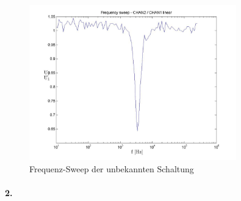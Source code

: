 \documentclass[a4paper]{article}
\begin{document}
\begin{figure}[H]
    \centering
    \includegraphics[width=0.8\textwidth]{versuch5_sweep_ylinxlog.jpg}
    \caption{Frequenz-Sweep der unbekannten Schaltung}
    \label{fig:versuch5-sweep}
\end{figure}

\paragraph{2.}
\end{document}
